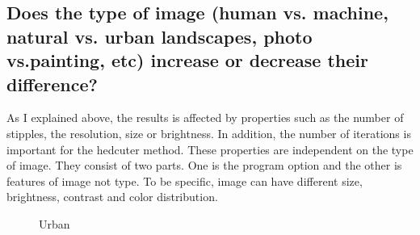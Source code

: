 \documentclass[11pt]{article}
\begin{document}
\subsection{Does the type of image (human vs. machine, natural vs. urban landscapes, photo vs.painting, etc) increase or decrease their difference?}%
As I explained above, the results is affected by properties such as the number of stipples, the resolution, size or brightness. In addition, the number of iterations is important for the hedcuter method. These properties are independent on the type of image. They consist of two parts. One is the program option and the other is features of image not type. To be specific, image can have different size, brightness, contrast and color distribution. 
\begin{figure}[ht] 
	\begin{center} 
	\hspace{5mm}
	\caption{Urban} 
	\label{fig:urban}
	\end{center} 
\end{figure}
\end{document}

